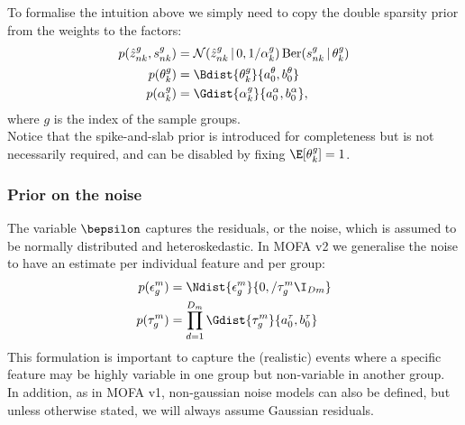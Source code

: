 To formalise the intuition above we simply need to copy the double sparsity prior from the weights to the factors:
\begin{align}
	p(\hat{z}_{nk}^g,s_{nk}^g) &= \mathcal{N} (\hat{z}_{nk}^g \,|\, 0, 1/\alpha_k^g)\, \text{Ber}(s_{nk}^g \,|\,\theta_k^g) \\
	p(\theta_k^g) &= \Bdist{\theta_k^g}{a_0^\theta,b_0^\theta} \\
	p(\alpha_k^g) &= \Gdist{\alpha_k^g}{a_0^\alpha, b_0^\alpha},
\end{align}
where $g$ is the index of the sample groups.\\
Notice that the spike-and-slab prior is introduced for completeness but is not necessarily required, and can be disabled by fixing $\E[\theta_k^g]=1$.

\subsubsection{Prior on the noise}

The variable $\bepsilon$ captures the residuals, or the noise, which is assumed to be normally distributed and heteroskedastic. In MOFA v2 we generalise the noise to have an estimate per individual feature and per group:
\begin{align}
	p(\epsilon^{m}_{g}) &= \Ndist{\epsilon^{m}_{g}}{0,/\tau^{m}_{g}\I_{Dm}} \\
	p(\tau^{m}_{g}) &= \prod_{d=1}^{D_m} \Gdist{\tau^{m}_{g}}{a_0^\tau, b_0^\tau}
\end{align}
This formulation is important to capture the (realistic) events where a specific feature may be highly variable in one group but non-variable in another group.\\
In addition, as in MOFA v1, non-gaussian noise models can also be defined, but unless otherwise stated, we will always assume Gaussian residuals.




